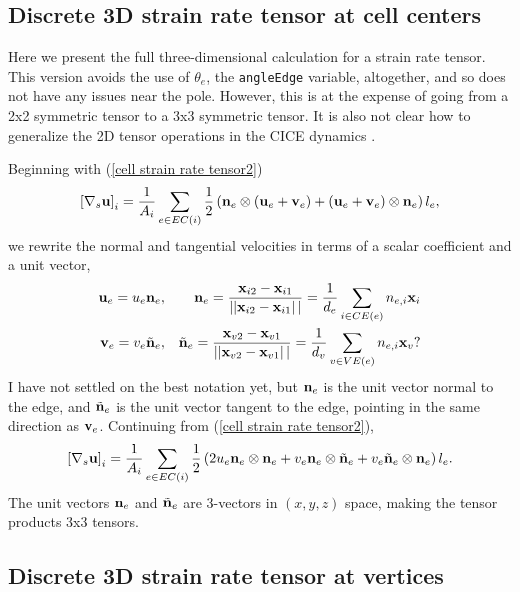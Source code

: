 \documentclass[11pt]{report}
\begin{document}
\subsection{Discrete 3D strain rate tensor at cell centers}

Here we present the full three-dimensional calculation for a strain rate tensor.  This version avoids the use of $\theta_e$, the \verb|angleEdge| variable, altogether, and so does not have any issues near the pole.  However, this is at the expense of going from a 2x2 symmetric tensor to a 3x3 symmetric tensor.  It is also not clear how to generalize the 2D tensor operations in the CICE dynamics \cite[section 3.4]{CICE_manual_4.1}.  

Beginning with (\ref{cell strain rate tensor2})
\begin{equation}
\label{cell strain rate tensor2}
\left[\nabla_s {\bf u} \right]_i
= 
\frac{1}{A_i} 
\sum_{e\in EC(i)}{\frac{1}{2}\left( 
  {\bf n}_e\otimes\left({\bf u}_e +{\bf v}_e \right)
+ \left({\bf u}_e +{\bf v}_e \right)\otimes{\bf n}_e\right)l_e },
\end{equation}
we rewrite the normal and tangential velocities in terms of a scalar coefficient and a unit vector,
\begin{eqnarray}
{\bf u}_e = u_e {\bf n}_e, 
  && {\bf n}_e = \frac{{\bf x}_{i2}-{\bf x}_{i1}}{\left||{\bf x}_{i2}-{\bf x}_{i1}\right||}
  = \frac{1}{d_e} \sum_{i\in CE(e)}n_{e,i}{\bf x}_{i} 
\\
{\bf v}_e = v_e \tilde{\bf n}_e, 
  && \tilde{\bf n}_e = \frac{{\bf x}_{v2}-{\bf x}_{v1}}{\left||{\bf x}_{v2}-{\bf x}_{v1}\right||}
  = \frac{1}{d_v} \sum_{v\in VE(e)}n_{e,i}{\bf x}_{v}?
\end{eqnarray}
I have not settled on the best notation yet, but ${\bf n}_e$ is the unit vector normal to the edge, and $\tilde{\bf n}_e $ is the unit vector tangent to the edge, pointing in the same direction as ${\bf v}_e$.  Continuing from (\ref{cell strain rate tensor2}), 
\begin{equation}
\label{cell strain rate tensor3}
\left[\nabla_s {\bf u} \right]_i
= 
\frac{1}{A_i} 
\sum_{e\in EC(i)}{\frac{1}{2}\left( 
 2u_e{\bf n}_e\otimes{\bf n}_e
+ v_e{\bf n}_e\otimes\tilde{\bf n}_e
+ v_e\tilde{\bf n}_e\otimes{\bf n}_e
\right)l_e }.
\end{equation}
The unit vectors ${\bf n}_e$ and $\tilde{\bf n}_e$ are 3-vectors in $(x,y,z)$ space, making the tensor products 3x3 tensors.


\subsection{Discrete 3D strain rate tensor at vertices}
\end{document}
